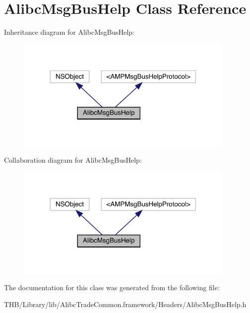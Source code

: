 \hypertarget{interface_alibc_msg_bus_help}{}\section{Alibc\+Msg\+Bus\+Help Class Reference}
\label{interface_alibc_msg_bus_help}


Inheritance diagram for Alibc\+Msg\+Bus\+Help\+:\nopagebreak
\begin{figure}[H]
\begin{center}
\leavevmode
\includegraphics[width=300pt]{interface_alibc_msg_bus_help__inherit__graph}
\end{center}
\end{figure}


Collaboration diagram for Alibc\+Msg\+Bus\+Help\+:\nopagebreak
\begin{figure}[H]
\begin{center}
\leavevmode
\includegraphics[width=300pt]{interface_alibc_msg_bus_help__coll__graph}
\end{center}
\end{figure}


The documentation for this class was generated from the following file\+:\begin{DoxyCompactItemize}
\item 
T\+H\+B/\+Library/lib/\+Alibc\+Trade\+Common.\+framework/\+Headers/Alibc\+Msg\+Bus\+Help.\+h\end{DoxyCompactItemize}
